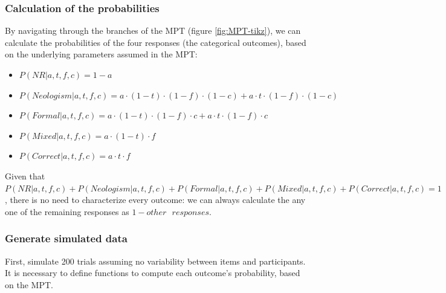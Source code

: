 \documentclass[12pt,]{krantz}
\providecommand{\tightlist}{%
  \setlength{\itemsep}{0pt}\setlength{\parskip}{0pt}}
\theoremstyle{definition}
\theoremstyle{definition}
\theoremstyle{definition}
\theoremstyle{remark}
\begin{document}
\subsubsection{Calculation of the
probabilities}\label{calculation-of-the-probabilities}

By navigating through the branches of the MPT (figure
\ref{fig:MPT-tikz}), we can calculate the probabilities of the four
responses (the categorical outcomes), based on the underlying parameters
assumed in the MPT:

\begin{itemize}
\tightlist
\item
  \(P(NR| a,t,f,c)= 1-a\)
\item
  \(P(Neologism| a,t,f,c)= a \cdot (1-t) \cdot (1-f) \cdot (1-c) + a \cdot t \cdot (1-f) \cdot (1-c)\)
\item
  \(P(Formal| a,t,f,c)= a \cdot (1-t) \cdot (1-f) \cdot c + a \cdot t \cdot (1-f) \cdot c\)
\item
  \(P(Mixed| a,t,f,c)= a \cdot (1-t) \cdot f\)
\item
  \(P(Correct| a,t,f,c)= a \cdot t \cdot f\)
\end{itemize}

Given that
\(P(NR| a,t,f,c) + P(Neologism| a,t,f,c) + P(Formal| a,t,f,c) + P(Mixed| a,t,f,c) + P(Correct| a,t,f,c) = 1\),
there is no need to characterize every outcome: we can always calculate
the any one of the remaining responses as
\(1 - other\text{ }responses\).

\subsubsection{Generate simulated data}\label{generate-simulated-data}

First, simulate 200 trials assuming no variability between items and
participants. It is necessary to define functions to compute each
outcome's probability, based on the MPT.
\end{document}
